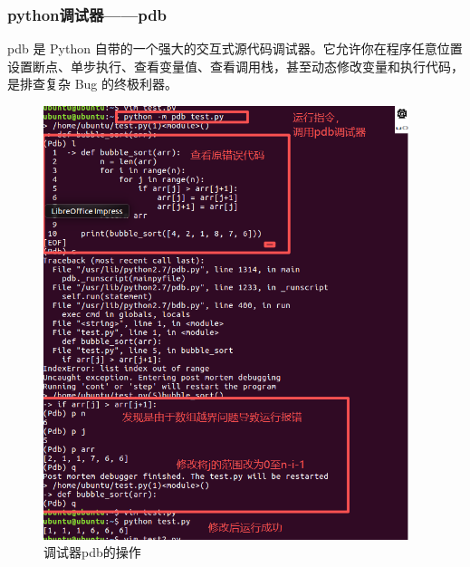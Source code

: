 \documentclass[UTF8]{ctexart}
\begin{document}
\subsubsection{ python调试器——pdb}
pdb 是 Python 自带的一个强大的交互式源代码调试器。它允许你在程序任意位置设置断点、单步执行、查看变量值、查看调用栈，甚至动态修改变量和执行代码，是排查复杂 Bug 的终极利器。
\begin{figure}[H]
    \centering
    \includegraphics[width=0.95\textwidth]{picture/调试器操作流程.png}
    \caption{调试器pdb的操作}
\end{figure}
\end{document}

